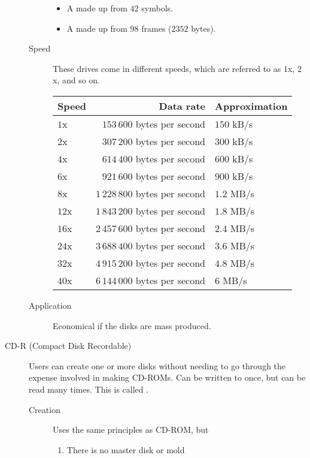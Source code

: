 \documentclass[../notes.tex]{subfiles}
\begin{document}
\begin{indentparagraph}
\begin{description}
\begin{description}
\begin{itemize}[nosep]
											\item A  made up from $42$ symbols.
											\item A  made up from $98$ frames ($2352$ bytes).
										\end{itemize}
									\pagebreak
									\item[Speed] These drives come in different speeds, which are referred to as $1$x, $2$x, and so on.
										\begin{center}
											\begin{tabular}{lrl}
												Speed & Data rate & Approximation\\
												\midrule
												$1$x  & $153\,600$ bytes per second    & $150$ kB/s\\
												$2$x  & $307\,200$ bytes per second    & $300$ kB/s\\
												$4$x  & $614\,400$ bytes per second    & $600$ kB/s\\
												$6$x  & $921\,600$ bytes per second    & $900$ kB/s\\
												$8$x  & $1\,228\,800$ bytes per second & $1.2$ MB/s\\
												$12$x & $1\,843\,200$ bytes per second & $1.8$ MB/s\\
												$16$x & $2\,457\,600$ bytes per second & $2.4$ MB/s\\
												$24$x & $3\,688\,400$ bytes per second & $3.6$ MB/s\\
												$32$x & $4\,915\,200$ bytes per second & $4.8$ MB/s\\
												$40$x & $6\,144\,000$ bytes per second & $6$ MB/s
											\end{tabular}
										\end{center}
									\item[Application] Economical if the disks are mass produced. 
								\end{description}
							\item[CD-R (Compact Disk Recordable)] Users can create one or more disks without needing to go through the expense involved in making CD-ROMs. Can be written to once, but can be read many times. This is called .
								\begin{description}
									\item[Creation] Uses the same principles as CD-ROM, but
										\begin{enumerate}[label=\alph*, nosep]
											\item There is no master disk or mold

\end{enumerate}
\end{description}
\end{description}
\end{indentparagraph}
\end{document}
